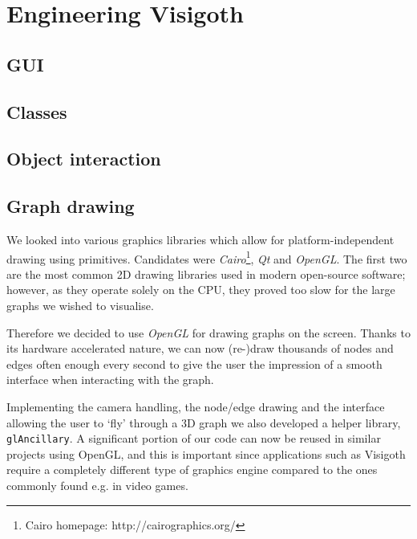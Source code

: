 \documentclass[a4paper,11pt,titlepage]{article}
\let\stdsection\section         %
\renewcommand{\section}{\newpage\stdsection}
\newcommand{\code}[1]{\texttt{#1}}
\newcommand{\buzz}[1]{\emph{#1}}
\begin{document}
\section{Engineering Visigoth}

\subsection{GUI}
\label{gui}

\subsection{Classes}

\subsection{Object interaction}
\label{interaction}

\subsection{Graph drawing}

We looked into various graphics libraries which allow for
platform-independent drawing using primitives. Candidates were
\buzz{Cairo}\footnote{Cairo homepage: http://cairographics.org/},
\buzz{Qt} and \buzz{OpenGL}. The first two are the
most common 2D drawing libraries used in modern open-source
software; however, as they operate solely on the CPU, they proved
too slow for the large graphs we wished to visualise.

Therefore we decided to use \buzz{OpenGL} for drawing graphs on
the screen. Thanks to its hardware accelerated nature, we can now
(re-)draw thousands of nodes and edges often enough every second
to give the user the impression of a smooth interface when interacting
with the graph.

Implementing the camera handling, the node/edge drawing and the
interface allowing the user to `fly' through a 3D graph we also
developed a helper library, \code{glAncillary}. A significant portion
of our code can now be reused in similar projects using OpenGL,
and this is important since applications such as Visigoth require a
completely different type of graphics engine compared to the ones
commonly found e.g. in video games.
\end{document}
